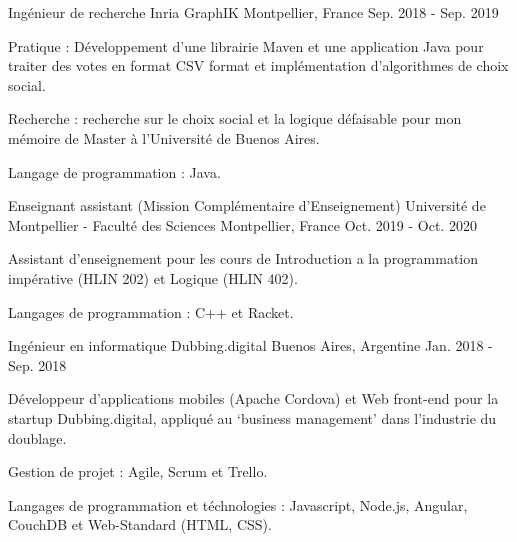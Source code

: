 

\begin{cventries}

\cventry
{Ingénieur de recherche}
{Inria GraphIK}
{Montpellier, France}
{Sep. 2018 - Sep. 2019}
{
\begin{cvitems}
\item Pratique : Développement d'une librairie Maven et une application Java pour traiter des votes en format CSV format et implémentation d'algorithmes de choix social.
\item Recherche : recherche sur le choix social et la logique défaisable pour mon mémoire de Master à l'Université de Buenos Aires.
\item Langage de programmation : Java.
\end{cvitems}
}  

\cventry
{Enseignant assistant (Mission Complémentaire d'Enseignement)} %
{Université de Montpellier - Faculté des Sciences} %
{Montpellier, France} %
{Oct. 2019 - Oct. 2020} %
{
  \begin{cvitems} %
    \item Assistant d'enseignement pour les cours de Introduction a la programmation imp\'erative (HLIN 202) et Logique (HLIN 402).
    \item Langages de programmation : C++ et Racket.
  \end{cvitems}
}

\cventry
{Ingénieur en informatique}
{Dubbing.digital}
{Buenos Aires, Argentine}
{Jan. 2018 - Sep. 2018}
{
\begin{cvitems}
\item Développeur d'applications mobiles (Apache Cordova) et Web front-end pour la startup Dubbing.digital, appliqué au `business management' dans l'industrie du doublage. 
\item Gestion de projet : Agile, Scrum et Trello.
\item Langages de programmation et téchnologies : Javascript, Node.js, Angular, CouchDB et Web-Standard (HTML, CSS).
\end{cvitems}
} 


\end{cventries}
